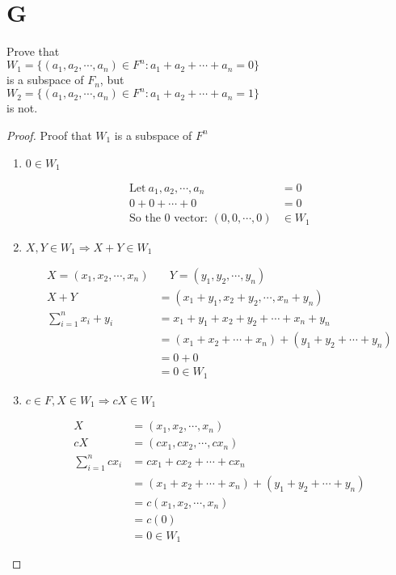 \documentclass[11pt]{scrartcl}
\makeatletter
\newenvironment{Dequation}
  {%
  \def\tagform@##1{%
    \maketag@@@{\makebox[0pt][r]{(\ignorespaces##1\unskip\@@italiccorr)}}}%
  \ignorespaces
  }
  {%
  \def\tagform@##1{\maketag@@@{(\ignorespaces##1\unskip\@@italiccorr)}}%
  \ignorespacesafterend
  }
\makeatother
\begin{document}
\section{G}
Prove that \\
$W_1 = \{(a_1, a_2,\cdots,a_n) \in F^n : a_1 + a_2 + \cdots + a_n= 0 \}$ \\
is a subspace of $F_n$, but\\
$W_2 =\{(a_1, a_2,\cdots,a_n) \in F^n : a_1 + a_2 + \cdots + a_n= 1\}$ \\
is not.
\begin{proof}
	Proof that $W_1$ is a subspace of $F^n$
	\begin{enumerate}[label=\alph*.]
		\item{
		$0 \in W_1$
		\begin{Dequation}
		\begin{align*}
			\text{Let} \ a_1, a_2, \cdots, a_n & = 0\\
			0 + 0 + \cdots + 0 & = 0 \\
			\text{So the 0 vector: }(0, 0, \cdots, 0) & \in W_1
		\end{align*}
		\end{Dequation}
		}
		\item{
		$X, Y \in W_1 \Rightarrow X + Y \in W_1$
		\begin{Dequation}
		\begin{align*}
			X = (x_1, x_2, \cdots, x_n) & \quad Y = (y_1, y_2, \cdots, y_n) \\
			X + Y & = (x_1 + y_1, x_2 + y_2, \cdots, x_n + y_n)\\
			\sum_{i = 1}^{n} x_i + y_i & = x_1 + y_1 + x_2 + y_2 + \cdots + x_n + y_n\\
			& = (x_1 + x_2 + \cdots + x_n) + (y_1 + y_2 + \cdots + y_n)\\
			& = 0 + 0 \\
			& = 0 \in W_1
		\end{align*}
		\end{Dequation}
		}
	\item{
	$c \in F, X \in W_1 \Rightarrow cX \in W_1$
	\begin{Dequation}
	\begin{align*}
		X & = (x_1, x_2, \cdots, x_n) \\
		cX & = (cx_1, cx_2, \cdots, cx_n) \\
		\sum_{i = 1}^{n} cx_i & = cx_1 +  cx_2 + \cdots + cx_n \\
		& = (x_1 + x_2 + \cdots + x_n) + (y_1 + y_2 + \cdots + y_n)\\
		& = c(x_1, x_2, \cdots, x_n) \\
		& = c(0) \\
		& = 0 \in W_1
	\end{align*}
	\end{Dequation}
	}
	\end{enumerate}
\end{proof}
\end{document}
